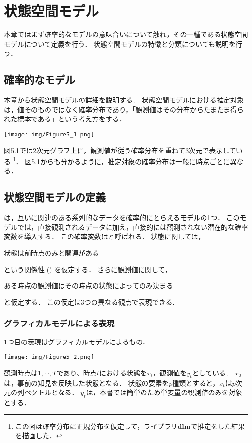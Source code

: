 \documentclass[11pt,a4paper]{jsarticle}
\numberwithin{equation}{section}
\begin{document}
\setcounter{section}{4}
\section{状態空間モデル}
本章ではまず確率的なモデルの意味合いについて触れ，その一種である状態空間モデルについて定義を行う．
状態空間モデルの特徴と分類についても説明を行う．

\subsection{確率的なモデル}
本章から状態空間モデルの詳細を説明する．
状態空間モデルにおける推定対象は，値そのものではなく確率分布であり，「観測値はその分布からたまたま得られた標本である」という考え方をする．
\begin{center}
\texttt{[image: img/Figure5\_1.png]}
\end{center}

図5.1では2次元グラフ上に，観測値が従う確率分布を重ねて3次元で表示している
\footnote{
この図は確率分布に正規分布を仮定して，ライブラリ{\bf dlm}で推定をした結果を描画した．
}．
図5.1からも分かるように，推定対象の確率分布は一般に時点ごとに異なる．

\subsection{状態空間モデルの定義}
は，互いに関連のある系列的なデータを確率的にとらえるモデルの1つ．
このモデルでは，直接観測されるデータに加え，直接的には観測されない潜在的な確率変数を導入する．
この確率変数はと呼ばれる．
状態に関しては，

\centerline{状態は前時点のみと関連がある}
という関係性 () を仮定する．
さらに観測値に関して，

\centerline{ある時点の観測値はその時点の状態によってのみ決まる}
と仮定する．
この仮定は3つの異なる観点で表現できる．

\subsubsection{グラフィカルモデルによる表現}
1つ目の表現はグラフィカルモデルによるもの．
\begin{center}
\texttt{[image: img/Figure5\_2.png]}
\end{center}

観測時点は$1, \cdots, T$であり、時点$t$における状態を$x_t$，観測値を$y_t$としている．
$x_0$は，事前の知見を反映した状態となる．
状態の要素を$p$種類とすると，$x_t$は$p$次元の列ベクトルとなる．
$y_t$は，本書では簡単のため単変量の観測値のみを対象とする．
\end{document}
